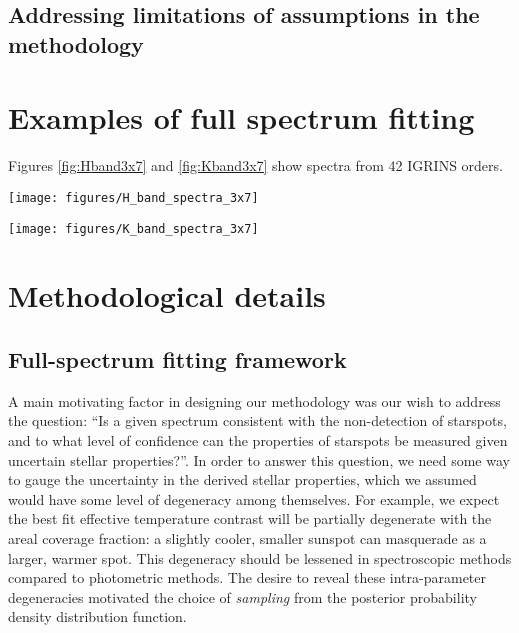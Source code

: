 \documentclass[onecolumn]{emulateapj}%
\begin{document}
\subsection{Addressing limitations of assumptions in the methodology}



\appendix

\section{Examples of full spectrum fitting}

Figures \ref{fig:Hband3x7} and \ref{fig:Kband3x7} show spectra from 42 IGRINS orders.


\begin{figure*}
	\centering
	\texttt{[image: figures/H\_band\_spectra\_3x7]}
	\caption{IGRINS Orders 94 and $99-119$.  Note that the $y-$axis is on a logarithmic scale.  }
	\label{fig:Hband3x7}
\end{figure*}

\begin{figure*}
	\centering
	\texttt{[image: figures/K\_band\_spectra\_3x7]}
	\caption{IGRINS Orders $73-93$.  Note that the $y-$axis is on a logarithmic scale.  }
	\label{fig:Kband3x7}
\end{figure*}


\section{Methodological details}
\label{methods-details}

\subsection{Full-spectrum fitting framework}


A main motivating factor in designing our methodology was our wish to address the question: ``Is a given spectrum consistent with the non-detection of starspots, and to what level of confidence can the properties of starspots be measured given uncertain stellar properties?''.  In order to answer this question, we need some way to gauge the uncertainty in the derived stellar properties, which we assumed would have some level of degeneracy among themselves.  For example, we expect the best fit effective temperature contrast will be partially degenerate with the areal coverage fraction: a slightly cooler, smaller sunspot can masquerade as a larger, warmer spot.  This degeneracy should be lessened in spectroscopic methods compared to photometric methods.  The desire to reveal these intra-parameter degeneracies motivated the choice of \emph{sampling} from the posterior probability density distribution function.
\end{document}
